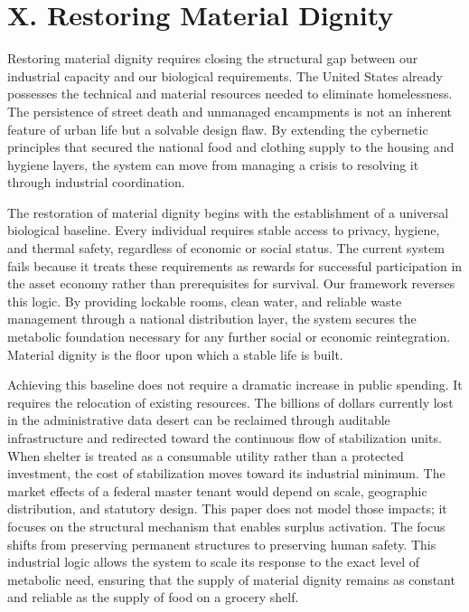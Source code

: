\documentclass[
  12pt,
]{article}
\begin{document}
\hypertarget{x.-restoring-material-dignity}{%
\section{X. Restoring Material Dignity}\label{x.-restoring-material-dignity}}

Restoring material dignity requires closing the structural gap between our industrial capacity and our biological requirements. The United States already possesses the technical and material resources needed to eliminate homelessness. The persistence of street death and unmanaged encampments is not an inherent feature of urban life but a solvable design flaw. By extending the cybernetic principles that secured the national food and clothing supply to the housing and hygiene layers, the system can move from managing a crisis to resolving it through industrial coordination.

The restoration of material dignity begins with the establishment of a universal biological baseline. Every individual requires stable access to privacy, hygiene, and thermal safety, regardless of economic or social status. The current system fails because it treats these requirements as rewards for successful participation in the asset economy rather than prerequisites for survival. Our framework reverses this logic. By providing lockable rooms, clean water, and reliable waste management through a national distribution layer, the system secures the metabolic foundation necessary for any further social or economic reintegration. Material dignity is the floor upon which a stable life is built.

Achieving this baseline does not require a dramatic increase in public spending. It requires the relocation of existing resources. The billions of dollars currently lost in the administrative data desert can be reclaimed through auditable infrastructure and redirected toward the continuous flow of stabilization units. When shelter is treated as a consumable utility rather than a protected investment, the cost of stabilization moves toward its industrial minimum. The market effects of a federal master tenant would depend on scale, geographic distribution, and statutory design. This paper does not model those impacts; it focuses on the structural mechanism that enables surplus activation. The focus shifts from preserving permanent structures to preserving human safety. This industrial logic allows the system to scale its response to the exact level of metabolic need, ensuring that the supply of material dignity remains as constant and reliable as the supply of food on a grocery shelf.
\end{document}
